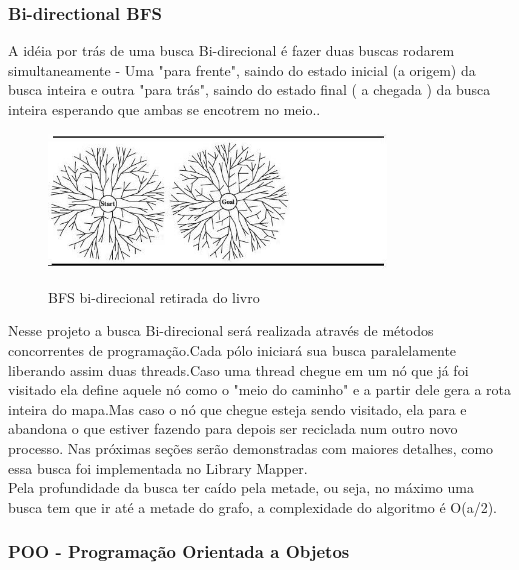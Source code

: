 \documentclass[a4paper,10pt]{article}
\begin{document}
      \subsubsection{Bi-directional BFS}
	A idéia por trás de uma busca Bi-direcional é fazer duas buscas rodarem simultaneamente - Uma "para frente", 	 
	saindo do estado inicial (a origem) da busca inteira e outra "para trás",  saindo do estado final ( a chegada ) 
	da busca inteira esperando que ambas se encotrem no meio.\cite{bidirecional}. 
 	\begin{figure}[H]
	\centering
	\includegraphics[width=0.8\textwidth]{./imgs/bi-directional.png}\\[1cm]   
	\caption{BFS bi-direcional retirada do livro \cite{bidirecional}}
      	\end{figure}
	Nesse projeto a busca Bi-direcional será realizada através de métodos concorrentes de programação.Cada pólo
	iniciará sua busca paralelamente liberando assim duas threads.Caso uma thread chegue em um nó que já foi 
	visitado ela define aquele nó como o "meio do caminho" e a partir dele gera a rota inteira do mapa.Mas caso o nó que
	chegue esteja sendo visitado, ela para e abandona o que estiver fazendo para depois ser reciclada num outro novo processo.
	Nas próximas seções serão demonstradas com maiores detalhes, como essa busca foi implementada no Library Mapper.\\
 
	Pela profundidade da busca ter caído pela metade, ou seja, no máximo uma busca tem que ir até a metade do grafo, a 
	complexidade do algoritmo é O(a/2).\\
	

	
	\subsubsection{POO - Programação Orientada a Objetos}	
\end{document}
